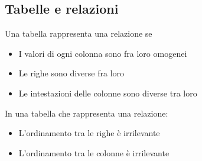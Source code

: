 \documentclass[12pt]{article}
\begin{document}
\subsection{Tabelle e relazioni}
Una tabella rappresenta una relazione se
\begin{itemize}
    \item I valori di ogni colonna sono fra loro omogenei
    \item Le righe sono diverse fra loro
    \item Le intestazioni delle colonne sono diverse tra loro
\end{itemize}
In una tabella che rappresenta una relazione:
\begin{itemize}
    \item L'ordinamento tra le righe è irrilevante
    \item L'ordinamento tra le colonne è irrilevante
\end{itemize}
\end{document}
